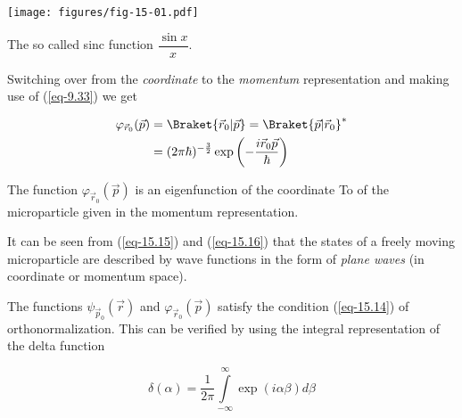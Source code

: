 \documentclass[a4paper,sfsidenotes,colorlinks=true]{tufte-book}
\numberwithin{equation}{section}
\numberwithin{figure}{section}
\begin{document}
\begin{marginfigure}%
\centering
\texttt{[image: figures/fig-15-01.pdf]}
\caption{The so called sinc function $\dfrac{\sin x }{x}$.}
\label{fig-15.1}
\end{marginfigure}

Switching over from the \emph{coordinate} to the \emph{momentum}
representation and making use of (\ref{eq-9.33}) we get 

\begin{equation}%
\begin{split}
 \varphi_{\vec{r}_{0}} (\vec{p}) & = \Braket{\vec{r}_{0}| \vec{p}}  = \Braket{\vec{p}| \vec{r}_{0}}^{*} \\
& = (2 \pi \hbar)^{-\frac{3}{2}} \exp \left(- \frac{ i \vec{r}_{0} \vec{p}}{\hbar} \right)
\end{split}
\label{eq-15.16}
\end{equation}

The function $\varphi_{\vec{r}_{0}} (\vec{p})$ is an eigenfunction of
the coordinate To of the microparticle given in the momentum
representation.


It can be seen from (\ref{eq-15.15}) and (\ref{eq-15.16}) that the states of a freely
moving microparticle are described by wave functions in the form of
\emph{plane waves} (in coordinate or momentum space).


The functions $\psi_{\vec{p}_{0}} (\vec{r})$ and
$\varphi_{\vec{r}_{0}} (\vec{p})$ satisfy the condition
(\ref{eq-15.14}) of orthonormalization. This can be verified by using
the integral representation of the delta function

\begin{equation}%
\delta (\alpha) = \frac{1}{2 \pi} \int\limits_{-\infty}^\infty \exp (i \alpha \beta) d \beta
\label{eq-15.17}
\end{equation}
\end{document}
